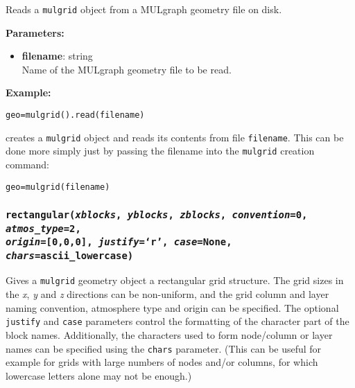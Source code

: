 Reads a \texttt{mulgrid} object from a MULgraph geometry file on disk.

\textbf{Parameters:}
\begin{itemize}
\item \textbf{filename}: string\\
  Name of the MULgraph geometry file to be read.
\end{itemize}

\textbf{Example:}

\begin{verbatim}
geo=mulgrid().read(filename)
\end{verbatim}

creates a \texttt{mulgrid} object and reads its contents from file \texttt{filename}.  This can be done more simply just by passing the filename into the \texttt{mulgrid} creation command:

\begin{verbatim}
geo=mulgrid(filename)
\end{verbatim}

\subsubsection{\texttt{rectangular(\emph{xblocks}, \emph{yblocks}, \emph{zblocks}, \emph{convention}=0, \emph{atmos\_type}=2,\\
    \emph{origin}=[0,0,0], \emph{justify}=`r', \emph{case}=None, \emph{chars}=ascii\_lowercase)}}
\label{sec:rectangular}

Gives a \texttt{mulgrid} geometry object a rectangular grid structure.  The grid sizes in the \emph{x}, \emph{y} and \emph{z} directions can be non-uniform, and the grid column and layer naming convention, atmosphere type and origin can be specified.  The optional \texttt{justify} and \texttt{case} parameters control the formatting of the character part of the block names.  Additionally, the characters used to form node/column or layer names can be specified using the \texttt{chars} parameter.  (This can be useful for example for grids with large numbers of nodes and/or columns, for which lowercase letters alone may not be enough.)

